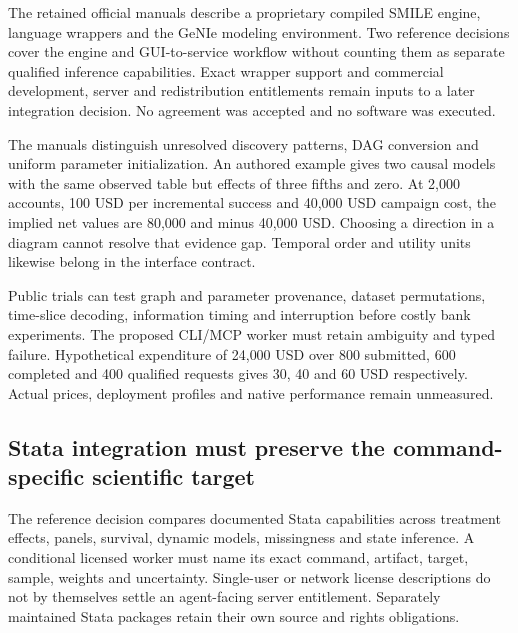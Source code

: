 The retained official manuals describe a proprietary compiled SMILE
engine, language wrappers and the GeNIe modeling environment. Two
reference decisions cover the engine and GUI-to-service workflow without
counting them as separate qualified inference capabilities. Exact
wrapper support and commercial development, server and redistribution
entitlements remain inputs to a later integration decision. No agreement
was accepted and no software was executed.
\citep{exec13_smile_intro,exec13_smile_license,exec24_smile_choice}

The manuals distinguish unresolved discovery patterns, DAG conversion
and uniform parameter initialization. An authored example gives two
causal models with the same observed table but effects of three fifths
and zero. At 2,000 accounts, 100 USD per incremental success and 40,000
USD campaign cost, the implied net values are 80,000 and minus 40,000
USD. Choosing a direction in a diagram cannot resolve that evidence gap.
Temporal order and utility units likewise belong in the interface
contract.
\citep{exec13_smile_pc,exec13_smile_pattern,exec13_genie_pattern,exec13_ct_smile_tutorial,exec16_cp_bayesfusion,exec24_smile_choice}

Public trials can test graph and parameter provenance, dataset
permutations, time-slice decoding, information timing and interruption
before costly bank experiments. The proposed CLI/MCP worker must retain
ambiguity and typed failure. Hypothetical expenditure of 24,000 USD over
800 submitted, 600 completed and 400 qualified requests gives 30, 40 and
60 USD respectively. Actual prices, deployment profiles and native
performance remain unmeasured. \citep{exec24_smile_choice}

\hypertarget{stata-integration-must-preserve-the-command-specific-scientific-target}{%
\subsection{Stata integration must preserve the command-specific
scientific
target}\label{stata-integration-must-preserve-the-command-specific-scientific-target}}

The reference decision compares documented Stata capabilities across
treatment effects, panels, survival, dynamic models, missingness and
state inference. A conditional licensed worker must name its exact
command, artifact, target, sample, weights and uncertainty. Single-user
or network license descriptions do not by themselves settle an
agent-facing server entitlement. Separately maintained Stata packages
retain their own source and rights obligations.
\citep{exec24_stata_choice}

